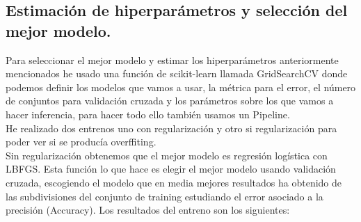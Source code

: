 \documentclass[a4paper,11pt]{article}
\begin{document}
\subsection{Estimación de hiperparámetros y selección del mejor modelo.}

Para seleccionar el mejor modelo y estimar los hiperparámetros anteriormente mencionados he usado una función de scikit-learn llamada GridSearchCV donde podemos definir los modelos que vamos a usar, la métrica para el error, el número de conjuntos para validación cruzada y los parámetros sobre los que vamos a hacer inferencia, para hacer todo ello también usamos un Pipeline.\\

He realizado dos entrenos uno con regularización y otro si regularización para poder ver si se producía overffiting.\\

Sin regularización obtenemos que el mejor modelo es regresión logística con LBFGS. Esta función lo que hace es elegir el mejor modelo usando validación cruzada, escogiendo el modelo que en media mejores resultados ha obtenido de las subdivisiones del conjunto de training estudiando el error asociado a la precisión (Accuracy). Los resultados del entreno son los siguientes:\\

\newpage
\end{document}

